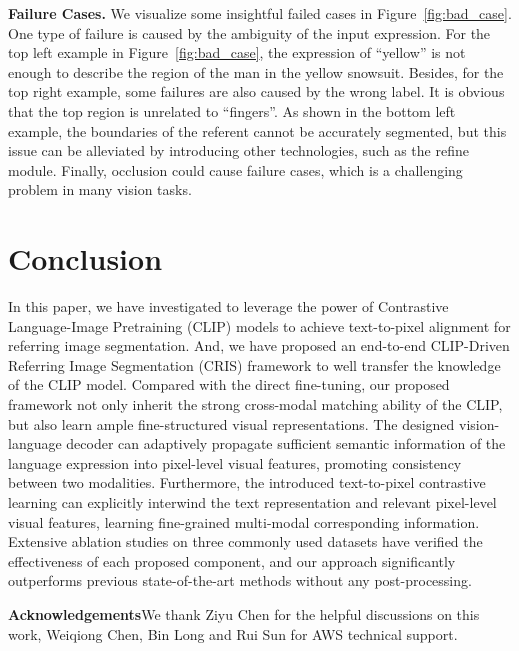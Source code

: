 \documentclass[10pt,twocolumn,letterpaper]{article}
\begin{document}
\textbf{Failure Cases.} We visualize some insightful failed cases in Figure~\ref{fig:bad_case}.
One type of failure is caused by the ambiguity of the input expression. For the top left example in Figure~\ref{fig:bad_case}, the expression of ``yellow'' is not enough to describe the region of the man in the yellow snowsuit.
Besides, for the top right example, some failures are also caused by the wrong label. It is obvious that the top region is unrelated to ``fingers''.
As shown in the bottom left example, the boundaries of the referent cannot be accurately segmented, but this issue can be alleviated by introducing other technologies, such as the refine module.
Finally, occlusion could cause failure cases, which is a challenging problem in many vision tasks. 
 

\section{Conclusion}
In this paper, we have investigated to leverage the power of Contrastive Language-Image Pretraining (CLIP) models to achieve text-to-pixel alignment for referring image segmentation.
And, we have proposed an end-to-end CLIP-Driven Referring Image Segmentation (CRIS) framework to well transfer the knowledge of the CLIP model.
Compared with the direct fine-tuning, our proposed framework not only inherit the strong cross-modal matching ability of the CLIP, but also learn ample fine-structured visual representations.
The designed vision-language decoder can adaptively propagate sufficient semantic information of the language expression into pixel-level visual features, promoting consistency between two modalities.
Furthermore, the introduced text-to-pixel contrastive learning can explicitly interwind the text representation and relevant pixel-level visual features, learning fine-grained multi-modal corresponding information.
Extensive ablation studies on three commonly used datasets have verified the effectiveness of each proposed component,
and our approach significantly outperforms previous state-of-the-art methods without any post-processing.

\textbf{Acknowledgements}\quad We thank Ziyu Chen for the helpful discussions on this work, Weiqiong Chen, Bin Long and Rui Sun for AWS technical support. 


{\small
  
  
}
\end{document}
